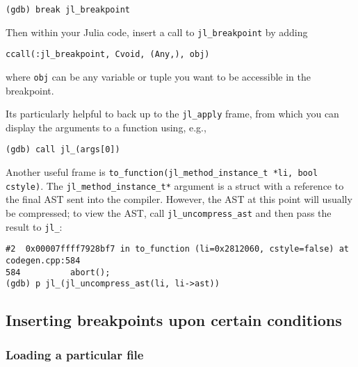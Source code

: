 \begin{lstlisting}
(gdb) break jl_breakpoint
\end{lstlisting}



Then within your Julia code, insert a call to \texttt{jl\_breakpoint} by adding




\begin{verbatim}
ccall(:jl_breakpoint, Cvoid, (Any,), obj)
\end{verbatim}



where \texttt{obj} can be any variable or tuple you want to be accessible in the breakpoint.



It{\textquotesingle}s particularly helpful to back up to the \texttt{jl\_apply} frame, from which you can display the arguments to a function using, e.g.,




\begin{lstlisting}
(gdb) call jl_(args[0])
\end{lstlisting}



Another useful frame is \texttt{to\_function(jl\_method\_instance\_t *li, bool cstyle)}. The \texttt{jl\_method\_instance\_t*} argument is a struct with a reference to the final AST sent into the compiler. However, the AST at this point will usually be compressed; to view the AST, call \texttt{jl\_uncompress\_ast} and then pass the result to \texttt{jl\_}:




\begin{lstlisting}
#2  0x00007ffff7928bf7 in to_function (li=0x2812060, cstyle=false) at codegen.cpp:584
584          abort();
(gdb) p jl_(jl_uncompress_ast(li, li->ast))
\end{lstlisting}



\hypertarget{10952602490249170772}{}


\subsection{Inserting breakpoints upon certain conditions}



\hypertarget{796097711199942153}{}


\subsubsection{Loading a particular file}



